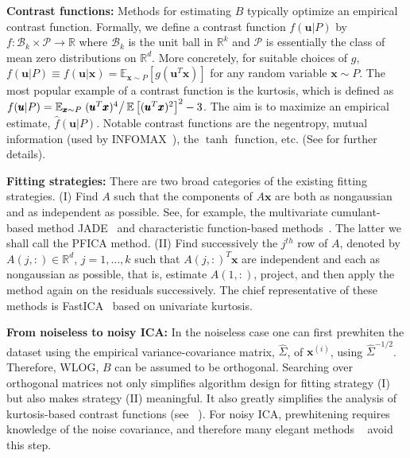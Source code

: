 \documentclass[letterpaper]{article}
\newcommand{\bu}{\pmb{u}}
\newcommand{\bx}{\pmb{x}}
\newcommand{\bk}{\color{black}}
\newcommand{\E}{\mathbb{E}}
\newcommand{\bbb}[1]{\left[#1\right]}
\begin{document}
\bk

\vspace{.1em}
\textbf{Contrast functions:}
 Methods for estimating $B$ typically optimize an empirical contrast function.
Formally, we define a contrast function $f(\bu|P)$ by $f:\mathcal{B}_k\times \mathcal{P}\rightarrow \mathbb{R}$ where $\mathcal{B}_k$ is the unit ball in $\mathbb{R}^k$ and $\mathcal{P}$ is essentially the class of mean zero distributions on $\mathbb{R}^d$. More concretely, for suitable choices of $g$, $f(\bu|P)\equiv f(\bu|\bx)=\E_{\bx\sim P}[g(\bu^T\bx)]$ for any random variable $\bx \sim P$.
The most popular example of a contrast function is the kurtosis, which is defined as $f(\bu|P)=\E_{\bx\sim P} \left.(\bu^T\bx)^4\right/\E\bbb{(\bu^T\bx)^2}^2-3$. 
The aim is to maximize an empirical estimate, $\hat{f}(\bu|P)$.  
Notable contrast functions are the negentropy, mutual information (used by INFOMAX~\cite{bell1995information}), the $\tanh$ function, etc. (See \cite{oja2000independent} for further details). 

\vspace{.1em}
\textbf{Fitting strategies: }
 There are two broad categories of the existing fitting strategies.
 (I) Find $A$ such that the components of $A\bx$ are both as nongaussian and as independent as possible. See, for example, the multivariate cumulant-based method JADE~\cite{JADE1993Cardoso} and characteristic function-based methods~\cite{ERIKSSON20032195,chen2005ICA}. The latter we shall call the PFICA method.
 (II) Find successively the $j^{th}$ row of $A$, denoted by $A(j,:)\in\mathbb{R}^d$, $j=1,\dots, k$ such that $A(j,:)^T\bx$ are independent and each as nongaussian as possible, that is, estimate $A(1,:)$, project, and then apply the method again on the residuals successively. The chief representative of these methods is FastICA~\cite{hyvarinen1999fast} based on univariate kurtosis. 

 \vspace{.1em}
 \textbf{From noiseless to noisy ICA: } In the noiseless case one can first prewhiten the dataset using the empirical variance-covariance matrix, $\hat{\Sigma}$, of $\bx^{(i)}$, using $\hat{\Sigma}^{-1/2}$. Therefore, WLOG, $B$ can be assumed to be orthogonal. Searching over orthogonal matrices not only simplifies algorithm design for fitting strategy (I) but also makes strategy (II) meaningful. It also greatly simplifies the analysis of kurtosis-based contrast functions (see ~\cite{conf/icassp/DelfosseL96}). For noisy ICA, prewhitening requires knowledge of the noise covariance, and therefore many elegant methods ~\cite{arora2012Quasi,DBLP:journals/corr/VossBR15,NIPS2015_89f03f7d} avoid this step. 
\end{document}
